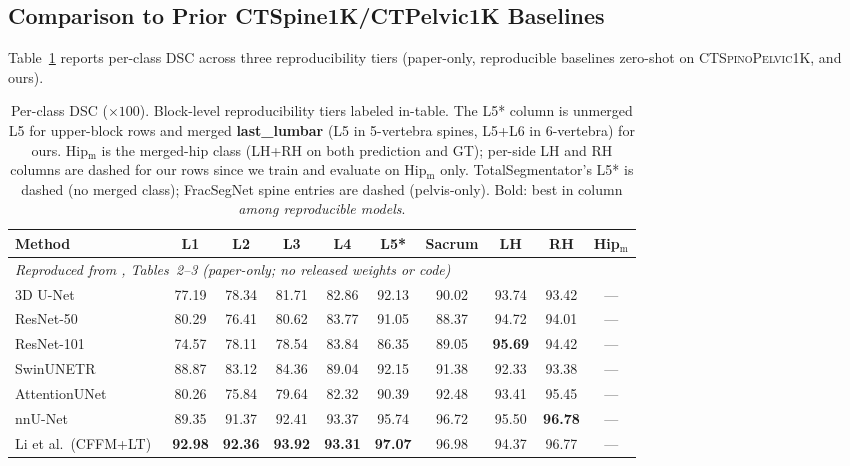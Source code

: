 \documentclass{article}
\newcommand{\dataset}{\textsc{CTSpinoPelvic1K}}
\newcommand{\TS}{TotalSegmentator}
\begin{document}
\subsection{Comparison to Prior CTSpine1K/CTPelvic1K
Baselines}
\label{sec:comparison}

Table~\ref{tab:comparison} reports per-class DSC across
three reproducibility tiers (paper-only, reproducible
baselines zero-shot on \dataset{}, and ours).

\begin{table}[t]
\caption{Per-class DSC ($\times 100$). Block-level
reproducibility tiers labeled in-table. The L5* column
is unmerged L5 for upper-block rows and merged
\textbf{last\_lumbar} (L5 in 5-vertebra spines, L5+L6
in 6-vertebra) for ours. Hip$_\text{m}$ is the
merged-hip class (LH+RH on both prediction and GT);
per-side LH and RH columns are dashed for our rows
since we train and evaluate on Hip$_\text{m}$ only.
\TS{}'s L5* is dashed (no merged class); FracSegNet
spine entries are dashed (pelvis-only). Bold: best in
column \emph{among reproducible models}.}
\label{tab:comparison}
\centering
\footnotesize
\setlength{\tabcolsep}{4pt}
\begin{tabular}{lccccccccc}
\toprule
\bfseries Method & \bfseries L1 & \bfseries L2 &
\bfseries L3 & \bfseries L4 & \bfseries L5* &
\bfseries Sacrum & \bfseries LH & \bfseries RH &
\bfseries Hip$_\text{m}$ \\
\midrule
\multicolumn{10}{l}{\emph{Reproduced from \citet{Li2025LumbarMechanism}, Tables~2--3 (paper-only; no released weights or code)}} \\
3D U-Net                & 77.19 & 78.34 & 81.71 & 82.86 & 92.13 & 90.02 & 93.74 & 93.42 & --- \\
ResNet-50               & 80.29 & 76.41 & 80.62 & 83.77 & 91.05 & 88.37 & 94.72 & 94.01 & --- \\
ResNet-101              & 74.57 & 78.11 & 78.54 & 83.84 & 86.35 & 89.05 & \textbf{95.69} & 94.42 & --- \\
SwinUNETR               & 88.87 & 83.12 & 84.36 & 89.04 & 92.15 & 91.38 & 92.33 & 93.38 & --- \\
AttentionUNet           & 80.26 & 75.84 & 79.64 & 82.32 & 90.39 & 92.48 & 93.41 & 95.45 & --- \\
nnU-Net~\citep{Isensee2020NnU-Net:Segmentation}     & 89.35 & 91.37 & 92.41 & 93.37 & 95.74 & 96.72 & 95.50 & \textbf{96.78} & --- \\
Li et al.\ (CFFM+LT)~\citep{Li2025LumbarMechanism}  & \textbf{92.98} & \textbf{92.36} & \textbf{93.92} & \textbf{93.31} & \textbf{97.07} & 96.98 & 94.37 & 96.77 & --- \\

\end{tabular}
\end{table}
\end{document}
